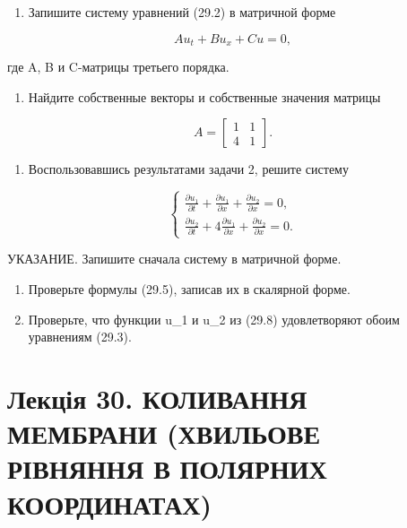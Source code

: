 \documentclass[
  ukrainian,
]{article}
\providecommand{\tightlist}{%
  \setlength{\itemsep}{0pt}\setlength{\parskip}{0pt}}
\begin{document}
\begin{enumerate}
\def\labelenumi{\arabic{enumi}.}
\tightlist
\item
  Запишите систему уравнений (29.2) в матричной форме
\end{enumerate}

\[
Au_t + Bu_x + Cu = 0,
\]

где A, B и C-матрицы третьего порядка.

\begin{enumerate}
\def\labelenumi{\arabic{enumi}.}
\setcounter{enumi}{1}
\tightlist
\item
  Найдите собственные векторы и собственные значения матрицы
\end{enumerate}

\[
A = \begin{bmatrix} 1 & 1 \\ 4 & 1 \end{bmatrix}.
\]

\begin{enumerate}
\def\labelenumi{\arabic{enumi}.}
\setcounter{enumi}{2}
\tightlist
\item
  Воспользовавшись результатами задачи 2, решите систему
\end{enumerate}

\[
\begin{cases} \frac{\partial u_1}{\partial t} + \frac{\partial u_1}{\partial x} + \frac{\partial u_2}{\partial x} = 0, \\ \frac{\partial u_2}{\partial t} + 4 \frac{\partial u_1}{\partial x} + \frac{\partial u_2}{\partial x} = 0. \end{cases}
\]

УКАЗАНИЕ. Запишите сначала систему в матричной форме.

\begin{enumerate}
\def\labelenumi{\arabic{enumi}.}
\setcounter{enumi}{3}
\item
  Проверьте формулы (29.5), записав их в скалярной форме.
\item
  Проверьте, что функции u\_1 и u\_2 из (29.8) удовлетворяют обоим
  уравнениям (29.3).
\end{enumerate}

\section{Лекція 30. КОЛИВАННЯ МЕМБРАНИ (ХВИЛЬОВЕ РІВНЯННЯ В ПОЛЯРНИХ
КООРДИНАТАХ)}\label{ux43bux435ux43aux446ux456ux44f-30.-ux43aux43eux43bux438ux432ux430ux43dux43dux44f-ux43cux435ux43cux431ux440ux430ux43dux438-ux445ux432ux438ux43bux44cux43eux432ux435-ux440ux456ux432ux43dux44fux43dux43dux44f-ux432-ux43fux43eux43bux44fux440ux43dux438ux445-ux43aux43eux43eux440ux434ux438ux43dux430ux442ux430ux445}
\end{document}
